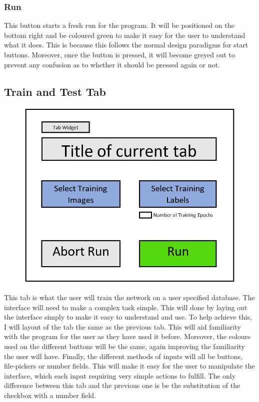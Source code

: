 \documentclass{report}
\begin{document}
\subsubsection{Run}

This button starts a fresh run for the program. It will be positioned on the bottom right and be coloured green to make it easy for the user to understand what it does. This is because this follows the normal design paradigms for start buttons. Moreover, once the button is pressed, it will become greyed out to prevent any confusion as to whether it should be pressed again or not. 
\newpage


\subsection{Train and Test Tab}

\begin{figure}[H]
    \centering
    \includegraphics[width=12cm]{Images/Graphical User Interface/Training Tab.png}
\end{figure}

This tab is what the user will train the network on a user specified database. The interface will need to make a complex task simple. This will done by laying out the interface simply to make it easy to understand and use. To help achieve this, I will layout of the tab the same as the previous tab. This will aid familiarity with the program for the user as they have used it before. Moreover, the colours used on the different buttons will be the same, again improving the familiarity the user will have. Finally, the different methods of inputs will all be buttons, file-pickers or number fields. This will make it easy for the user to manipulate the interface, which each input requiring very simple actions to fulfill. The only difference between this tab and the previous one is be the substitution of the checkbox with a number field.
\end{document}
